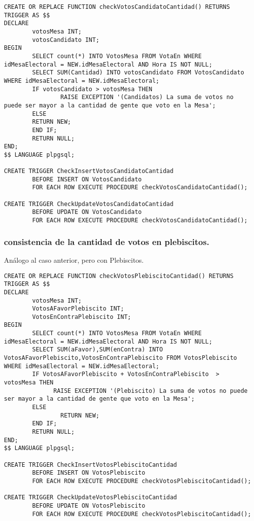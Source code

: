 \begin{verbatim}
CREATE OR REPLACE FUNCTION checkVotosCandidatoCantidad() RETURNS TRIGGER AS $$
DECLARE
        votosMesa INT;
        votosCandidato INT; 
BEGIN
        SELECT count(*) INTO VotosMesa FROM VotaEn WHERE idMesaElectoral = NEW.idMesaElectoral AND Hora IS NOT NULL;
        SELECT SUM(Cantidad) INTO votosCandidato FROM VotosCandidato WHERE idMesaElectoral = NEW.idMesaElectoral;
        IF votosCandidato > votosMesa THEN
                RAISE EXCEPTION '(Candidatos) La suma de votos no puede ser mayor a la cantidad de gente que voto en la Mesa';
        ELSE
        RETURN NEW;
        END IF;
        RETURN NULL;
END;
$$ LANGUAGE plpgsql;

CREATE TRIGGER CheckInsertVotosCandidatoCantidad
        BEFORE INSERT ON VotosCandidato
        FOR EACH ROW EXECUTE PROCEDURE checkVotosCandidatoCantidad();

CREATE TRIGGER CheckUpdateVotosCandidatoCantidad
        BEFORE UPDATE ON VotosCandidato
        FOR EACH ROW EXECUTE PROCEDURE checkVotosCandidatoCantidad();

\end{verbatim}

\subsubsection{consistencia de la cantidad de votos en plebiscitos.}

\indent Análogo al caso anterior, pero con Plebiscitos.\\

\begin{verbatim}
CREATE OR REPLACE FUNCTION checkVotosPlebiscitoCantidad() RETURNS TRIGGER AS $$
DECLARE
        votosMesa INT;
        VotosAFavorPlebiscito INT; 
        VotosEnContraPlebiscito INT;
BEGIN
        SELECT count(*) INTO VotosMesa FROM VotaEn WHERE idMesaElectoral = NEW.idMesaElectoral AND Hora IS NOT NULL;
        SELECT SUM(aFavor),SUM(enContra) INTO VotosAFavorPlebiscito,VotosEnContraPlebiscito FROM VotosPlebiscito WHERE idMesaElectoral = NEW.idMesaElectoral;
        IF VotosAFavorPlebiscito + VotosEnContraPlebiscito  > votosMesa THEN
              RAISE EXCEPTION '(Plebiscito) La suma de votos no puede ser mayor a la cantidad de gente que voto en la Mesa';
        ELSE
                RETURN NEW;
        END IF;
        RETURN NULL;
END;
$$ LANGUAGE plpgsql;

CREATE TRIGGER CheckInsertVotosPlebiscitoCantidad
        BEFORE INSERT ON VotosPlebiscito
        FOR EACH ROW EXECUTE PROCEDURE checkVotosPlebiscitoCantidad();

CREATE TRIGGER CheckUpdateVotosPlebiscitoCantidad
        BEFORE UPDATE ON VotosPlebiscito
        FOR EACH ROW EXECUTE PROCEDURE checkVotosPlebiscitoCantidad();
\end{verbatim}
\newpage

